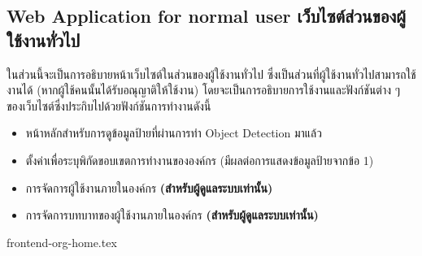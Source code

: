 \clearpage
\subsection{\ifenglish Web Application for normal user \else เว็บไซต์ส่วนของผู้ใช้งานทั่วไป \fi}
\ifenglish \else
ในส่วนนี้จะเป็นการอธิบายหน้าเว็บไซต์ในส่วนของผู้ใช้งานทั่วไป ซึ่งเป็นส่วนที่ผู้ใช้งานทั่วไปสามารถใช้งานได้ (หากผู้ใช้คนนั้นได้รับอณุญาติให้ใช้งาน) โดยจะเป็นการอธิบายการใช้งานและฟังก์ชันต่าง ๆ ของเว็บไซต์ซึ่งประกิบไปด้วยฟังก์ชันการทำงานดังนี้
\begin{itemize}
    \item หน้าหลักสำหรับการดูข้อมูลป้ายที่ผ่านการทำ Object Detection มาแล้ว
    \item ตั้งค่าเพื่อระบุพิกัดขอบเขตการทำงานขององค์กร (มีผลต่อการแสดงข้อมูลป้ายจากข้อ 1)
    \item การจัดการผู้ใช้งานภายในองค์กร \textbf{(สำหรับผู้ดูแลระบบเท่านั้น)}
    \item การจัดการบทบาทของผู้ใช้งานภายในองค์กร \textbf{(สำหรับผู้ดูแลระบบเท่านั้น)}
\end{itemize}
\fi

{frontend-org-home.tex}